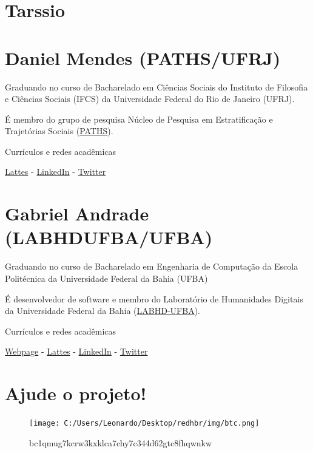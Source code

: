 \documentclass[
]{book}
\begin{document}
\hypertarget{tarssio}{%
\section{Tarssio}\label{tarssio}}

\hypertarget{daniel-mendes-pathsufrj}{%
\section{Daniel Mendes (PATHS/UFRJ)}\label{daniel-mendes-pathsufrj}}

Graduando no curso de Bacharelado em Ciências Sociais do Instituto de Filosofia e Ciências Sociais (IFCS) da Universidade Federal do Rio de Janeiro (UFRJ).

É membro do grupo de pesquisa Núcleo de Pesquisa em Estratificação e Trajetórias Sociais (\href{https://www.facebook.com/paths.research/}{PATHS}).

Currículos e redes acadêmicas

\href{http://lattes.cnpq.br/9834413442426550}{Lattes} - \href{https://www.linkedin.com/in/daniel-mendes-251212176/}{LinkedIn} - \href{https://twitter.com/danielmnds34}{Twitter}

\hypertarget{gabriel-andrade-labhdufbaufba}{%
\section{Gabriel Andrade (LABHDUFBA/UFBA)}\label{gabriel-andrade-labhdufbaufba}}

Graduando no curso de Bacharelado em Engenharia de Computação da Escola Politécnica da Universidade Federal da Bahia (UFBA)

É desenvolvedor de software e membro do Laboratório de Humanidades Digitais da Universidade Federal da Bahia (\href{http://www.labhd.ufba.br/}{LABHD-UFBA}).

Currículos e redes acadêmicas

\href{https://gabrielsandrade.github.io}{Webpage} - \href{http://lattes.cnpq.br/4915378425369073}{Lattes} - \href{https://www.linkedin.com/in/gabriel-andrade-633996108}{LinkedIn} - \href{https://twitter.com/ga_brieell_}{Twitter}

\hypertarget{ajude-o-projeto}{%
\section{Ajude o projeto!}\label{ajude-o-projeto}}

\begin{figure}
\centering
\texttt{[image: C:/Users/Leonardo/Desktop/redhbr/img/btc.png]}
\caption{bc1qmug7kcrw3kxklca7chy7c344d62gtc8fhqwnkw}
\end{figure}

  
\end{document}
